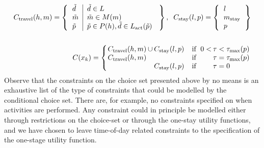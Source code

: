 \begin{subequations}
\begin{align}
    C_\text{travel}(h,m) = 
    \left \{
    {
    \begin{tabular}{l|l}
    	$\act{d}$ & $\act{d} \in  L$                                      \\
    	$\act{m}$ & $\act{m} \in M(m)$                                    \\
    	$\act{p}$ & $\act{p} \in P(h), \act{d} \in L_\text{act}(\act{p})$
    \end{tabular}
  } \right\},\;\; C_\text{stay}(l,p) = 
    \left \{ { \begin{tabular}{l}
    	$l$             \\
    	$m_\text{stay}$ \\
    	$p$
    \end{tabular} } \right\} \\ \nonumber \\
    C(x_{k}) = \left \{
    {\setlength\tabcolsep{1pt}
    \begin{tabular}{lllll}
    	$C_\text{travel}(h,m)$ & $\cup$ & $C_\text{stay}(l,p)$ & \;\; if \;$0<$ & $\tau<\tau_\text{max}(p)$   \\
    	$C_\text{travel}(h,m)$ &        &                      & \;\;  if \;    & $\tau = \tau_\text{max}(p)$ \\
    	                       &        & $C_\text{stay}(l,p)$ & \;\; if \;     & $\tau = 0$
    \end{tabular}
  }
    \right.
\end{align}
\end{subequations}
Observe that the constraints on the choice set presented above by no means is an exhaustive list of the type of constraints that could be modelled by the conditional choice set. There are, for example, no constraints specified on when activities are performed. Any constraint could in principle be modelled either through restrictions on the choice-set or through the one-stay utility functions, and we have chosen to leave time-of-day related constraints to the specification of the one-stage utility function. 
